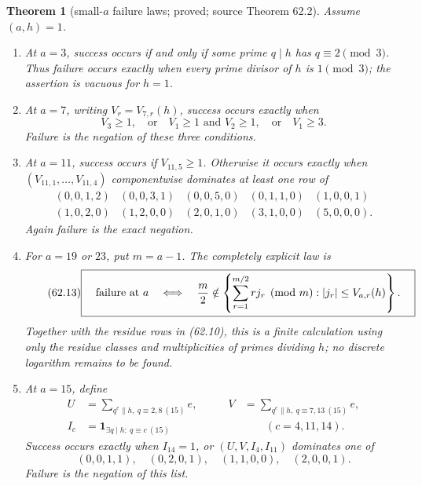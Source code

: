 \documentclass[10pt,reqno]{amsart}
\newtheorem{theorem}{Theorem}[section]
\theoremstyle{definition}
\newcommand{\1}{\mathbf 1}
\begin{document}
\begin{theorem}[small-$a$ failure laws; proved; source Theorem 62.2]
\label{thm:small-a-laws}
Assume $(a,h)=1$.
\begin{enumerate}[leftmargin=*,label=\arabic*.]
\item At $a=3$, success occurs if and only if some prime $q\mid h$ has
$q\equiv2\pmod3$.  Thus failure occurs exactly when every prime divisor of
$h$ is $1\pmod3$; the assertion is vacuous for $h=1$.
\item At $a=7$, writing $V_r=V_{7,r}(h)$, success occurs exactly when
\begin{equation}\tag{62.11}
 V_3\geq1,\quad\text{or}\quad V_1\geq1\text{ and }V_2\geq1,
 \quad\text{or}\quad V_1\geq3.
\end{equation}
Failure is the negation of these three conditions.
\item At $a=11$, success occurs if $V_{11,5}\geq1$.  Otherwise it occurs
exactly when $(V_{11,1},\ldots,V_{11,4})$ componentwise dominates at least
one row of
\begingroup\scriptsize
\begin{equation}\tag{62.12}
\begin{array}{ccccc}
(0,0,1,2)&(0,0,3,1)&(0,0,5,0)&(0,1,1,0)&(1,0,0,1)\\
(1,0,2,0)&(1,2,0,0)&(2,0,1,0)&(3,1,0,0)&(5,0,0,0).
\end{array}
\end{equation}
\endgroup
Again failure is the exact negation.
\item For $a=19$ or $23$, put $m=a-1$.  The completely explicit law is
\begin{equation}\tag{62.13}
\boxed{\quad\text{failure at }a\quad\Longleftrightarrow\quad
 {m\over2}\notin
 \left\{\sum_{r=1}^{m/2}rj_r\pmod m:
                 |j_r|\leq V_{a,r}(h)\right\}.\quad}
\end{equation}
Together with the residue rows in (62.10), this is a finite calculation
using only the residue classes and multiplicities of primes dividing $h$;
no discrete logarithm remains to be found.
\item At $a=15$, define
\begin{equation}\tag{62.14}
\begin{aligned}
 U&=\sum_{q^e\parallel h,\ q\equiv2,8\ (15)}e,
 &\qquad V&=\sum_{q^e\parallel h,\ q\equiv7,13\ (15)}e,\\
 I_c&=\boldsymbol1_{\exists q\mid h:\ q\equiv c\ (15)}
 &&\qquad(c=4,11,14).
\end{aligned}
\end{equation}
Success occurs exactly when $I_{14}=1$, or $(U,V,I_4,I_{11})$ dominates
one of
\begin{equation}\tag{62.15}
 (0,0,1,1),\quad(0,2,0,1),\quad
 (1,1,0,0),\quad(2,0,0,1).
\end{equation}
Failure is the negation of this list.
\end{enumerate}
\end{theorem}
\end{document}
